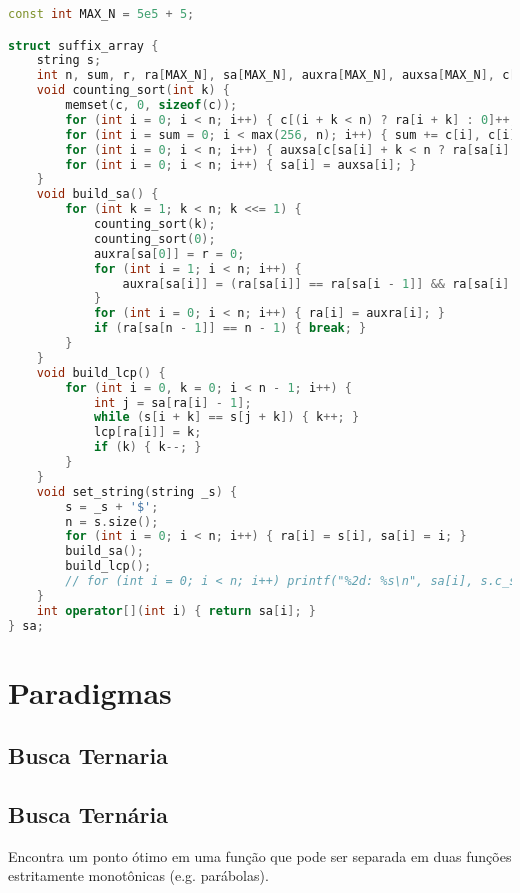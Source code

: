 \documentclass[11pt, a4paper, twoside]{article}
\begin{document}
\begin{lstlisting}[language=C++]
const int MAX_N = 5e5 + 5;

struct suffix_array {
    string s;
    int n, sum, r, ra[MAX_N], sa[MAX_N], auxra[MAX_N], auxsa[MAX_N], c[MAX_N], lcp[MAX_N];
    void counting_sort(int k) {
        memset(c, 0, sizeof(c));
        for (int i = 0; i < n; i++) { c[(i + k < n) ? ra[i + k] : 0]++; }
        for (int i = sum = 0; i < max(256, n); i++) { sum += c[i], c[i] = sum - c[i]; }
        for (int i = 0; i < n; i++) { auxsa[c[sa[i] + k < n ? ra[sa[i] + k] : 0]++] = sa[i]; }
        for (int i = 0; i < n; i++) { sa[i] = auxsa[i]; }
    }
    void build_sa() {
        for (int k = 1; k < n; k <<= 1) {
            counting_sort(k);
            counting_sort(0);
            auxra[sa[0]] = r = 0;
            for (int i = 1; i < n; i++) {
                auxra[sa[i]] = (ra[sa[i]] == ra[sa[i - 1]] && ra[sa[i] + k] == ra[sa[i - 1] + k]) ? r : ++r;
            }
            for (int i = 0; i < n; i++) { ra[i] = auxra[i]; }
            if (ra[sa[n - 1]] == n - 1) { break; }
        }
    }
    void build_lcp() {
        for (int i = 0, k = 0; i < n - 1; i++) {
            int j = sa[ra[i] - 1];
            while (s[i + k] == s[j + k]) { k++; }
            lcp[ra[i]] = k;
            if (k) { k--; }
        }
    }
    void set_string(string _s) {
        s = _s + '$';
        n = s.size();
        for (int i = 0; i < n; i++) { ra[i] = s[i], sa[i] = i; }
        build_sa();
        build_lcp();
        // for (int i = 0; i < n; i++) printf("%2d: %s\n", sa[i], s.c_str() + sa[i]);
    }
    int operator[](int i) { return sa[i]; }
} sa;
\end{lstlisting}

\newpage
%
%
%
%

\section{Paradigmas}

\subsection{Busca Ternaria}

\subsection{Busca Ternária}


Encontra um ponto ótimo em uma função que pode ser separada em duas funções estritamente monotônicas (e.g. parábolas).
\end{document}
